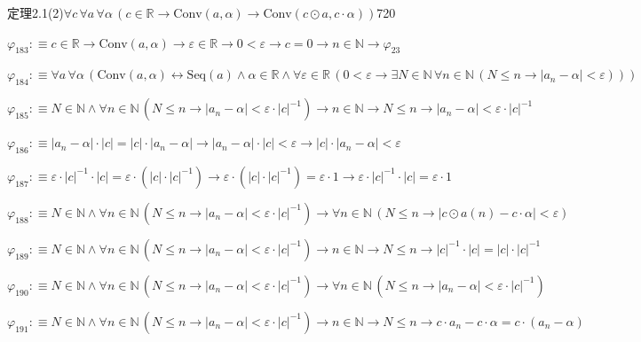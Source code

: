 \begin{fullproof}{定理2.1(2)}{$\forall c\,\forall a\,\forall \alpha\,(c \in \mathbb{R} \to \mathrm{Conv}(a,\alpha) \to \mathrm{Conv}(c \odot a,c \cdot \alpha))$}{720}
\begin{abbrevlist}
\item $\varphi_{183} :\equiv c \in \mathbb{R} \to \mathrm{Conv}(a,\alpha) \to \varepsilon \in \mathbb{R} \to 0 < \varepsilon \to c = 0 \to n \in \mathbb{N} \to \varphi_{23}$
\item $\varphi_{184} :\equiv \forall a\,\forall \alpha\,(\mathrm{Conv}(a,\alpha) \leftrightarrow \mathrm{Seq}(a) \land \alpha \in \mathbb{R} \land \forall \varepsilon \in \mathbb{R}\,(0 < \varepsilon \to \exists N \in \mathbb{N}\,\forall n \in \mathbb{N}\,(N \leq n \to \lvert a_{n} - \alpha \rvert < \varepsilon)))$
\item $\varphi_{185} :\equiv N \in \mathbb{N} \land \forall n \in \mathbb{N}\,(N \leq n \to \lvert a_{n} - \alpha \rvert < \varepsilon \cdot \lvert c \rvert^{-1}) \to n \in \mathbb{N} \to N \leq n \to \lvert a_{n} - \alpha \rvert < \varepsilon \cdot \lvert c \rvert^{-1}$
\item $\varphi_{186} :\equiv \lvert a_{n} - \alpha \rvert \cdot \lvert c \rvert = \lvert c \rvert \cdot \lvert a_{n} - \alpha \rvert \to \lvert a_{n} - \alpha \rvert \cdot \lvert c \rvert < \varepsilon \to \lvert c \rvert \cdot \lvert a_{n} - \alpha \rvert < \varepsilon$
\item $\varphi_{187} :\equiv \varepsilon \cdot \lvert c \rvert^{-1} \cdot \lvert c \rvert = \varepsilon \cdot (\lvert c \rvert \cdot \lvert c \rvert^{-1}) \to \varepsilon \cdot (\lvert c \rvert \cdot \lvert c \rvert^{-1}) = \varepsilon \cdot 1 \to \varepsilon \cdot \lvert c \rvert^{-1} \cdot \lvert c \rvert = \varepsilon \cdot 1$
\item $\varphi_{188} :\equiv N \in \mathbb{N} \land \forall n \in \mathbb{N}\,(N \leq n \to \lvert a_{n} - \alpha \rvert < \varepsilon \cdot \lvert c \rvert^{-1}) \to \forall n \in \mathbb{N}\,(N \leq n \to \lvert c \odot a(n) - c \cdot \alpha \rvert < \varepsilon)$
\item $\varphi_{189} :\equiv N \in \mathbb{N} \land \forall n \in \mathbb{N}\,(N \leq n \to \lvert a_{n} - \alpha \rvert < \varepsilon \cdot \lvert c \rvert^{-1}) \to n \in \mathbb{N} \to N \leq n \to \lvert c \rvert^{-1} \cdot \lvert c \rvert = \lvert c \rvert \cdot \lvert c \rvert^{-1}$
\item $\varphi_{190} :\equiv N \in \mathbb{N} \land \forall n \in \mathbb{N}\,(N \leq n \to \lvert a_{n} - \alpha \rvert < \varepsilon \cdot \lvert c \rvert^{-1}) \to \forall n \in \mathbb{N}\,(N \leq n \to \lvert a_{n} - \alpha \rvert < \varepsilon \cdot \lvert c \rvert^{-1})$
\item $\varphi_{191} :\equiv N \in \mathbb{N} \land \forall n \in \mathbb{N}\,(N \leq n \to \lvert a_{n} - \alpha \rvert < \varepsilon \cdot \lvert c \rvert^{-1}) \to n \in \mathbb{N} \to N \leq n \to c \cdot a_{n} - c \cdot \alpha = c \cdot (a_{n} - \alpha)$

\end{abbrevlist}
\end{fullproof}
